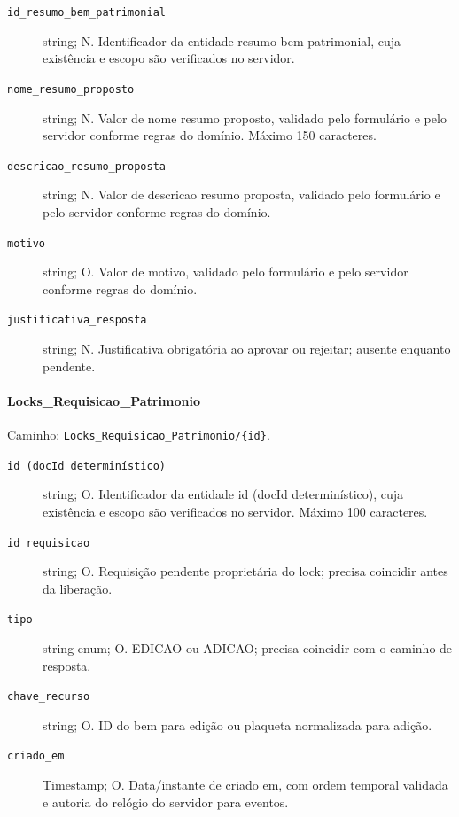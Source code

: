 \begin{description}
\item[\texttt{id\_resumo\_bem\_patrimonial}] string; N. Identificador da entidade resumo bem patrimonial, cuja existência e escopo são verificados no servidor.
\item[\texttt{nome\_resumo\_proposto}] string; N. Valor de nome resumo proposto, validado pelo formulário e pelo servidor conforme regras do domínio. Máximo 150 caracteres.
\item[\texttt{descricao\_resumo\_proposta}] string; N. Valor de descricao resumo proposta, validado pelo formulário e pelo servidor conforme regras do domínio.
\item[\texttt{motivo}] string; O. Valor de motivo, validado pelo formulário e pelo servidor conforme regras do domínio.
\item[\texttt{justificativa\_resposta}] string; N. Justificativa obrigatória ao aprovar ou rejeitar; ausente enquanto pendente.
\end{description}

\paragraph{Locks\_Requisicao\_Patrimonio}\mbox{}\par
Caminho: \texttt{Locks\_Requisicao\_Patrimonio/\{id\}}.
\begin{description}
\item[\texttt{id (docId determinístico)}] string; O. Identificador da entidade id (docId determinístico), cuja existência e escopo são verificados no servidor. Máximo 100 caracteres.
\item[\texttt{id\_requisicao}] string; O. Requisição pendente proprietária do lock; precisa coincidir antes da liberação.
\item[\texttt{tipo}] string enum; O. EDICAO ou ADICAO; precisa coincidir com o caminho de resposta.
\item[\texttt{chave\_recurso}] string; O. ID do bem para edição ou plaqueta normalizada para adição.
\item[\texttt{criado\_em}] Timestamp; O. Data/instante de criado em, com ordem temporal validada e autoria do relógio do servidor para eventos.
\end{description}


